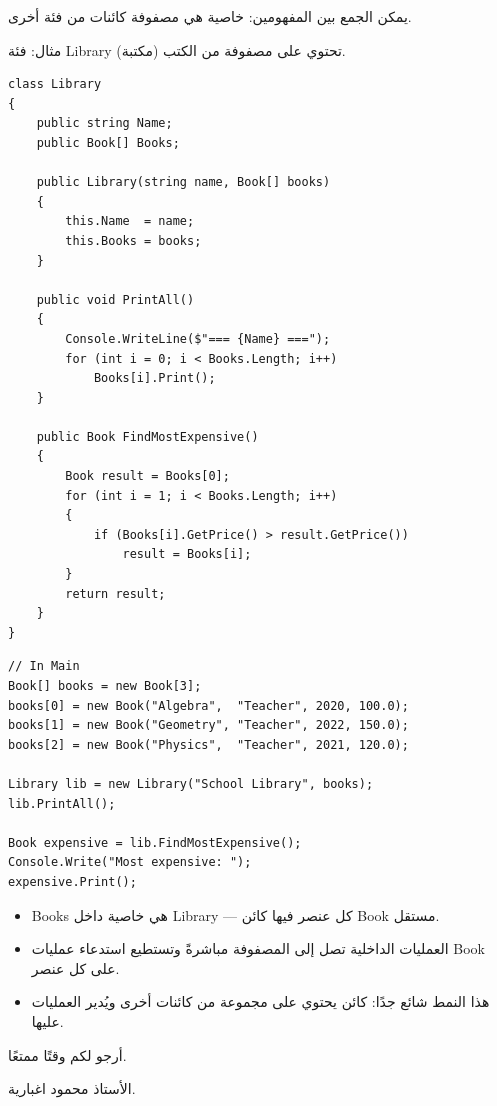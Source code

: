 \documentclass[14pt]{extarticle}
\begin{document}
يمكن الجمع بين المفهومين: خاصية هي مصفوفة كائنات من فئة أخرى.

\begin{boxNote}
مثال: فئة \textenglish{Library} (مكتبة) تحتوي على مصفوفة من الكتب.
\end{boxNote}

{\small
\begin{boxExample}
\begin{english}
\begin{verbatim}
class Library
{
    public string Name;
    public Book[] Books;

    public Library(string name, Book[] books)
    {
        this.Name  = name;
        this.Books = books;
    }

    public void PrintAll()
    {
        Console.WriteLine($"=== {Name} ===");
        for (int i = 0; i < Books.Length; i++)
            Books[i].Print();
    }

    public Book FindMostExpensive()
    {
        Book result = Books[0];
        for (int i = 1; i < Books.Length; i++)
        {
            if (Books[i].GetPrice() > result.GetPrice())
                result = Books[i];
        }
        return result;
    }
}
\end{verbatim}
\end{english}
\end{boxExample}

\begin{boxExample}
\begin{english}
\begin{verbatim}
// In Main
Book[] books = new Book[3];
books[0] = new Book("Algebra",  "Teacher", 2020, 100.0);
books[1] = new Book("Geometry", "Teacher", 2022, 150.0);
books[2] = new Book("Physics",  "Teacher", 2021, 120.0);

Library lib = new Library("School Library", books);
lib.PrintAll();

Book expensive = lib.FindMostExpensive();
Console.Write("Most expensive: ");
expensive.Print();
\end{verbatim}
\end{english}
\end{boxExample}
}

\begin{itemize}[itemsep=1pt]
    \item \textenglish{Books} هي خاصية داخل \textenglish{Library} — كل عنصر فيها كائن \textenglish{Book} مستقل.
    \item العمليات الداخلية تصل إلى المصفوفة مباشرةً وتستطيع استدعاء عمليات \textenglish{Book} على كل عنصر.
    \item هذا النمط شائع جدًا: كائن يحتوي على مجموعة من كائنات أخرى ويُدير العمليات عليها.
\end{itemize}

\vspace{1em}
\begin{flushleft}
أرجو لكم وقتًا ممتعًا.

الأستاذ محمود اغبارية.
\end{flushleft}
\end{document}

